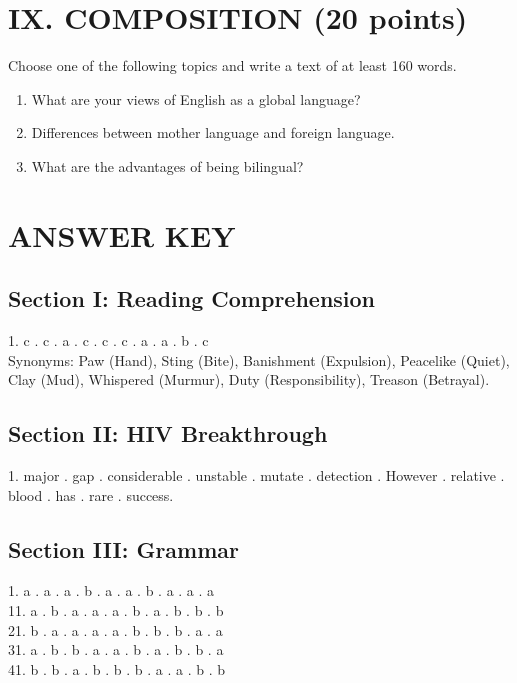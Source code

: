 \documentclass[11pt,a4paper]{article}
\begin{document}
\vspace{0.5cm}

\section{IX. COMPOSITION (20 points)}

Choose one of the following topics and write a text of at least 160 words.
\begin{enumerate}
    \item What are your views of English as a global language?
    \item Differences between mother language and foreign language.
    \item What are the advantages of being bilingual?
\end{enumerate}

\vspace{10cm}
\dotfill

\newpage

\section{ANSWER KEY}

\subsection{Section I: Reading Comprehension}
1. c . c . a . c . c . c . a . a . b . c \\
Synonyms: Paw (Hand), Sting (Bite), Banishment (Expulsion), Peacelike (Quiet), Clay (Mud), Whispered (Murmur), Duty (Responsibility), Treason (Betrayal).

\subsection{Section II: HIV Breakthrough}
1. major . gap . considerable . unstable . mutate . detection . However . relative . blood . has . rare . success.

\subsection{Section III: Grammar}
1. a . a . a . b . a . a . b . a . a . a \\
11. a . b . a . a . a . b . a . b . b . b \\
21. b . a . a . a . a . b . b . b . a . a \\
31. a . b . b . a . a . b . a . b . b . a \\
41. b . b . a . b . b . b . a . a . b . b
\end{document}
